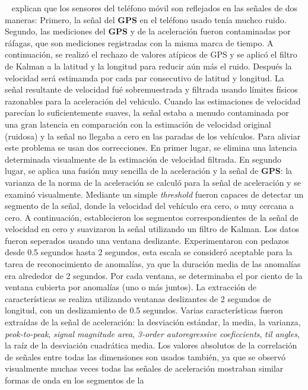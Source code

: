 ~\cite{perttunen2011distributed} explican que los sensores del teléfono móvil son reflejados en las señales de dos maneras: Primero, la señal del \textbf{GPS}
en el teléfono usado tenía muchco ruido. Segundo, las mediciones del \textbf{GPS} y de la aceleración fueron contaminadas por ráfagas, que son mediciones registradas con la
misma marca de tiempo. A continuación, se realizó el rechazo de valores atípicos de GPS y se aplicó el filtro de Kalman a la latitud y la longitud para reducir
aún más el ruido. Después la velocidad será estimamda por cada par consecutivo de latitud y longitud. La señal resultante de velocidad fué sobremuestrada y filtrada
usando límites físicos razonables para la aceleración del vehiculo. Cuando las estimaciones de velocidad parecían lo suficientemente suaves, la señal estaba
a menudo contaminada por una gran latencia en comparación con la estimación de velocidad original (ruidosa) y la señal no llegaba a cero en las paradas de los vehículos.
Para aliviar este problema se usan dos correcciones. En primer lugar, se elimina una latencia determinada visualmente de la estimación de velocidad filtrada. En segundo
lugar, se aplica una fusión muy sencilla de la aceleración y la señal de \textbf{GPS}: la varianza de la norma de la aceleración se calculó para la señal de aceleración
y se examinó visualmente. Mediante un simple \emph{threshold} fueron capaces de detectar un segmento de la señal, donde la velocidad del vehículo era cero, o muy cercana
a cero. A continuación, establecieron los segmentos correspondientes de la señal de velocidad en cero y suavizaron la señal utilizando un filtro de Kalman. Los datos
fueron seperados usando una ventana deslizante. Experimentaron con pedazos desde 0.5 segundos hasta 2 segundos, esta escala se consideró aceptable para la tarea de
reconocimiento de anomalías, ya que la duración media de las anomalías era alrededor de 2 segundos. Por cada ventana, se determinaba el por ciento de la ventana cubierta
por anomalías (uno o más juntos). La extracción de características se realiza utilizando ventanas deslizantes de 2 segundos de longitud, con un deslizamiento de 0.5
segundos. Varias características fueron extraídas de la señal de aceleración: la desviación estándar, la media, la varianza, \emph{peok-to-peak}, \emph{signal magnitude area},
\emph{3-order autoregressive coeficcients}, \emph{til angles}, la raíz de la desviación cuadrática media. Los valores absolutos de la correlación de señales entre todas
las dimensiones son usados también, ya que se observó visualmente muchas veces todas las señales de aceleración mostraban similar formas de onda en los segmentos de la
